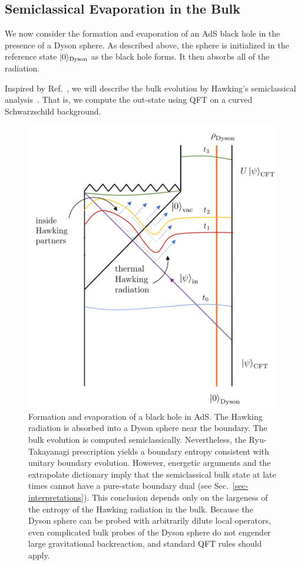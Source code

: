 \documentclass[12pt,letterpaper]{article}
\begin{document}
\subsection{Semiclassical Evaporation in the Bulk}
\label{sec-hawking}

We now consider the formation and evaporation of an AdS black hole in the presence of a Dyson sphere. As described above, the sphere is initialized in the reference state $|0\rangle_{\rm Dyson}$ as the black hole forms. It then absorbs all of the radiation.

Inspired by Ref.~\cite{Pen19,AEMM}, we will describe the bulk evolution by Hawking's semiclassical analysis~\cite{Haw74}. That is, we compute the out-state using QFT on a curved Schwarzschild background.
\begin{figure}%
    \centering
    \includegraphics[width=.5\textwidth]{dysonf}
    \caption{Formation and evaporation of a black hole in AdS. The Hawking radiation is absorbed into a Dyson sphere near the boundary. The bulk evolution is computed semiclassically. Nevertheless, the Ryu-Takayanagi prescription yields a boundary entropy consistent with unitary boundary evolution. However, energetic arguments and the extrapolate dictionary imply that the semiclassical bulk state at late times cannot have a pure-state boundary dual (see Sec.~\ref{sec-interpretations}). This conclusion depends only on the largeness of the entropy of the Hawking radiation in the bulk. Because the Dyson sphere can be probed with arbitrarily dilute local operators, even complicated bulk probes of the Dyson sphere do not engender large gravitational backreaction, and standard QFT rules should apply.}%
    \label{fig-dyson}%
\end{figure}
\end{document}
